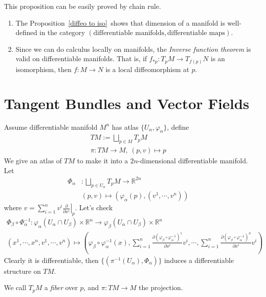 This proposition can be easily proved by chain rule.

\begin{rem}
    \begin{enumerate}[(1)]
        \item The Proposition~\ref{diffeo to iso}~shows that dimension of a manifold is well-defined in the category $(\text{differentiable manifolds},\text{differentiable maps})$.
        \item Since we can do calculus locally on manifolds, the \emph{Inverse function theorem} is valid on differentiable manifolds.
        That is, if $f_{*p}:T_pM\to T_{f(p)}N$ is an isomorphism, then $f:M\to N$ is a local diffeomorphism at $p$.
    \end{enumerate}
\end{rem}

\section{Tangent Bundles and Vector Fields}
\begin{defn}
    Assume differentiable manifold $M^n$ has atlas $\{U_\alpha,\varphi_\alpha\}$, define
    \begin{gather*}
        TM:=\bigsqcup_{p\in M}T_pM\\
        \pi:TM\to M,\ (p,v)\mapsto p
    \end{gather*}
    We give an atlas of $TM$ to make it into a $2n$-dimensional differentiable manifold.
    Let
    \begin{align*}
        \Phi_\alpha&:\bigsqcup_{p\in U_\alpha}T_pM\to\mathbb{R}^{2n}\\
        &(p,v)\mapsto(\varphi_\alpha(p),(v^1,\cdots,v^n))
    \end{align*}
    where $v=\sum_{i=1}^nv^i\left.\frac{\partial{}}{\partial{x^i}}\right|_p$.
    Let's check
    \begin{gather*}
        \Phi_\beta\circ\Phi_\alpha^{-1}:\varphi_{\alpha}(U_\alpha\cap U_\beta)\times\mathbb{R}^n\to\varphi_\beta(U_\alpha\cap U_\beta)\times\mathbb{R}^n\\
        (x^1,\cdots,x^n,v^1,\cdots,v^n)\mapsto\left(\varphi_\beta\circ\varphi_\alpha^{-1}(x),\sum_{i=1}^n\frac{\partial(\varphi_\beta\circ\varphi_\alpha^{-1})^1}{\partial{x^i}}v^i,\cdots,\sum_{i=1}^n\frac{\partial(\varphi_\beta\circ\varphi_\alpha^{-1})^n}{\partial{x^i}}v^i\right)
    \end{gather*}
    Clearly it is differentiable, then $\{(\pi^{-1}(U_\alpha),\Phi_\alpha)\}$ induces a differentiable structure on $TM$.

    We call $T_pM$ a \emph{fiber} over $p$, and $\pi:TM\to M$ the projection.
\end{defn}

